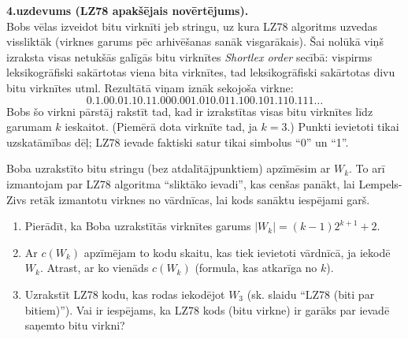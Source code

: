 \documentclass[a4paper,12pt]{article}
\begin{document}



\vspace{10pt}
{\bf 4.uzdevums (LZ78 apakšējais novērtējums).}\\
Bobs vēlas izveidot bitu virknīti jeb stringu, uz kura 
LZ78 algoritms uzvedas vissliktāk (virknes garums pēc arhivēšanas sanāk visgarākais).
Šai nolūkā viņš izraksta visas netukšās galīgās bitu virknītes {\em Shortlex order} secībā:
vispirms leksikogrāfiski sakārtotas viena bita virknītes, tad leksikogrāfiski sakārtotas
divu bitu virknītes utml. Rezultātā viņam iznāk sekojoša virkne:
$$\mathtt{0.1.00.01.10.11.000.001.010.011.100.101.110.111}\ldots$$
Bobs šo virkni pārstāj rakstīt tad, kad ir izrakstītas visas bitu virknītes līdz garumam $k$ ieskaitot. 
(Piemērā dota virknīte tad, ja $k=3$.) Punkti ievietoti tikai uzskatāmības dēļ; LZ78 
ievade faktiski satur tikai simbolus ``0'' un ``1''.

Boba uzrakstīto bitu stringu (bez atdalītājpunktiem) apzīmēsim ar $W_k$. 
To arī izmantojam par LZ78 algoritma ``sliktāko ievadi'', 
kas cenšas panākt, lai Lempels-Zivs retāk
izmantotu virknes no vārdnīcas, lai kods sanāktu iespējami garš.

\begin{enumerate}[label=(\alph*)]
\item Pierādīt, ka Boba uzrakstītās virknītes garums $|W_k| = (k-1)2^{k+1} + 2$.
\item Ar $c(W_k)$ apzīmējam to kodu skaitu, kas tiek ievietoti vārdnīcā, ja iekodē $W_k$. 
Atrast, ar ko vienāds $c(W_k)$ (formula, kas atkarīga no $k$).
\item Uzrakstīt LZ78 kodu, kas rodas iekodējot $W_3$ (sk. slaidu ``LZ78 (biti par bitiem)''). 
Vai ir iespējams, ka LZ78 kods (bitu virkne) ir garāks par ievadē saņemto bitu virkni?
\end{enumerate}
\end{document}
